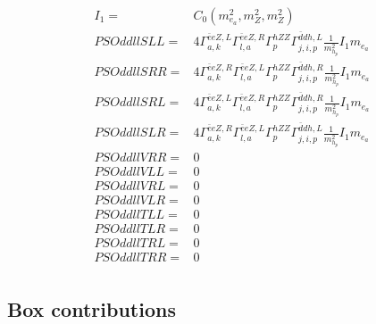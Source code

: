 \documentclass[A4,landscape]{article}
\begin{document}
\begin{align} 
I_1= & C_0(m^2_{e_{{a}}}, m^2_{Z}, m^2_{Z}) \\ 
  PSOddllSLL= & 4  \Gamma^{\bar{e}e Z ,L}_{a, k} \Gamma^{\bar{e}e Z ,R}_{l, a} \Gamma^{h Z Z }_{p} \Gamma^{\bar{d}d h ,L}_{j, i, p} \frac{1}{m^2_{h_{{p}}}} I_1 m_{e_{{a}}} \\ 
  PSOddllSRR= & 4  \Gamma^{\bar{e}e Z ,R}_{a, k} \Gamma^{\bar{e}e Z ,L}_{l, a} \Gamma^{h Z Z }_{p} \Gamma^{\bar{d}d h ,R}_{j, i, p} \frac{1}{m^2_{h_{{p}}}} I_1 m_{e_{{a}}} \\ 
  PSOddllSRL= & 4  \Gamma^{\bar{e}e Z ,L}_{a, k} \Gamma^{\bar{e}e Z ,R}_{l, a} \Gamma^{h Z Z }_{p} \Gamma^{\bar{d}d h ,R}_{j, i, p} \frac{1}{m^2_{h_{{p}}}} I_1 m_{e_{{a}}} \\ 
  PSOddllSLR= & 4  \Gamma^{\bar{e}e Z ,R}_{a, k} \Gamma^{\bar{e}e Z ,L}_{l, a} \Gamma^{h Z Z }_{p} \Gamma^{\bar{d}d h ,L}_{j, i, p} \frac{1}{m^2_{h_{{p}}}} I_1 m_{e_{{a}}} \\ 
  PSOddllVRR= & 0 \\ 
  PSOddllVLL= & 0 \\ 
  PSOddllVRL= & 0 \\ 
  PSOddllVLR= & 0 \\ 
  PSOddllTLL= & 0 \\ 
  PSOddllTLR= & 0 \\ 
  PSOddllTRL= & 0 \\ 
  PSOddllTRR= & 0 \\ 
\end{align} 
\subsection{Box contributions} 
\end{document}

